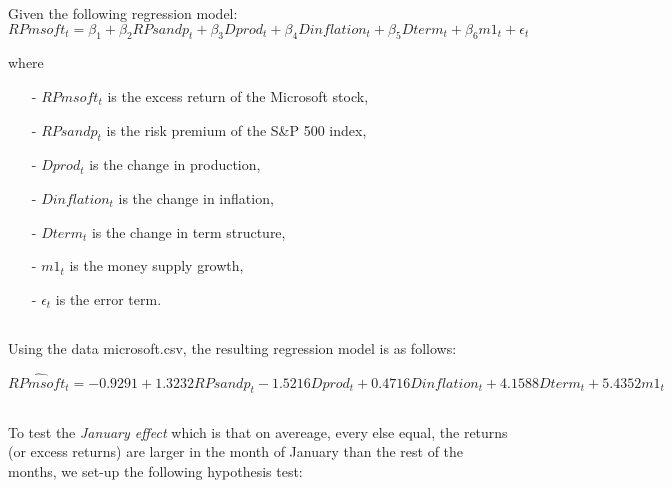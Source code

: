 Given the following regression model:
$$
RPmsoft_t = \beta_1 + \beta_2RPsandp_t + \beta_3 Dprod_t + \beta_4Dinflation_t + \beta_5Dterm_t + \beta_6m1_t + \epsilon_t
$$

where 
\begin{itemize}[label=(alpha*)]
    \item[-] $RPmsoft_t$ is the excess return of the Microsoft stock,
    \item[-] $RPsandp_t$ is the risk premium of the S\&P 500 index,
    \item[-] $Dprod_t$ is the change in production,
    \item[-] $Dinflation_t$ is the change in inflation,
    \item[-] $Dterm_t$ is the change in term structure,
    \item[-] $m1_t$ is the money supply growth,
    \item[-] $\epsilon_t$ is the error term.
\end{itemize}

\subsection{}
Using the data microsoft.csv, the resulting regression model is as follows:

$$
\widehat{RPmsoft_t} = -0.9291 + 1.3232RPsandp_t -1.5216Dprod_t + 0.4716Dinflation_t + 4.1588Dterm_t + 5.4352m1_t 
$$

\begin{center}
\end{center}

\subsection{}
To test the \textit{January effect} which is that on avereage, every else equal, the returns (or excess returns) are larger in the month of January than the rest of the months, we set-up the following hypothesis test:

